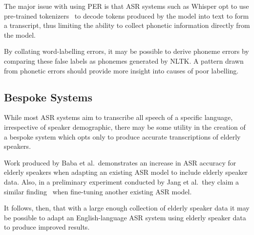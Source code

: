 The major issue with using PER is that ASR systems such as Whisper opt to use pre-trained
tokenizers~\cite{huggingfacetransformers} to decode tokens produced by the model into text to
form a transcript, thus limiting the ability to collect phonetic information directly from the
model.

By collating word-labelling errors, it may be possible to derive phoneme errors by comparing
these false labels as phonemes generated by NLTK\@.
A pattern drawn from phonetic errors should provide more insight into causes of poor labelling.

\subsection{Bespoke Systems}\label{subsec:bespoke-systems}

While most ASR systems aim to transcribe all speech of a specific language, irrespective of
speaker demographic, there may be some utility in the creation of a bespoke system which opts
only to produce accurate transcriptions of elderly speakers.

Work produced by Baba et al.\ demonstrates an increase in ASR accuracy for elderly speakers when
adapting an existing ASR model to include elderly speaker data\cite{baba2004}.
Also, in a preliminary experiment conducted by Jang et al.\ they claim a similar
finding~\cite{vote400} when fine-tuning another existing ASR model.

It follows, then, that with a large enough collection of elderly speaker data it may be possible
to adapt an English-language ASR system using elderly speaker data to produce improved results.